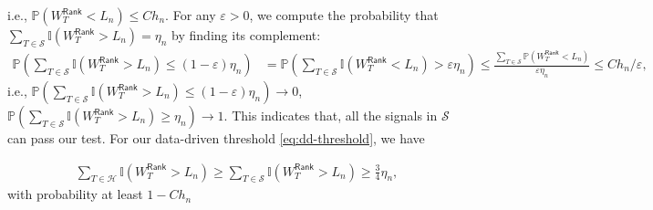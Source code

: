 \documentclass[12pt]{article}
\newcommand{\tF}{{\rm F}}
\newcommand{\abs}[1]{\left\lvert#1\right\rvert}
\newcommand{\norm}[1]{\left\lVert#1\right\rVert}
\newcommand{\PP}{\mathbb{P}}
\newcommand{\cH}{\mathcal{H}}
\newcommand{\cP}{\mathcal{P}}
\newcommand{\cS}{\mathcal{S}}
\newcommand{\bbI}{\mathbb{I}}
\def\PP{{\mathbb P}}
\theoremstyle{plain}
\begin{document}
i.e., $\PP(W_T^\mathsf{Rank}< L_n ) \le C h_n$.  For any $\varepsilon>0$, we compute the probability that $\sum\limits_{T\in\cS} \bbI(W_T^\mathsf{Rank}> L_n)=\eta_n$ by finding its complement:
 \begin{equation*}
\begin{aligned}
               \PP(\sum\limits_{T\in\cS} \bbI(W_T^\mathsf{Rank}> L_n)\le (1-\varepsilon)\eta_n )& =\PP(\sum\limits_{T\in\cS} \bbI(W_T^\mathsf{Rank}< L_n)> \varepsilon\eta_n )  \le \frac{\sum\limits_{T\in\cS} \PP(W_T^\mathsf{Rank}< L_n)}{\varepsilon\eta_n}\le C h_n/\varepsilon,
\end{aligned}
 \end{equation*}
 i.e., $ \PP(\sum\limits_{T\in\cS} \bbI(W_T^\mathsf{Rank}> L_n)\le (1-\varepsilon)\eta_n )\to 0$, $ \PP(\sum\limits_{T\in\cS} \bbI(W_T^\mathsf{Rank}> L_n)\ge \eta_n )\to 1$. This indicates that, all the signals in $\cS$ can pass our test. For our data-driven threshold \eqref{eq:dd-threshold}, we have 
 
  \begin{equation}\label{eq:dd-thre-lb}
\begin{aligned}
             \sum\limits_{T\in\cH} \bbI(W_T^\mathsf{Rank}> L_n)\ge   \sum\limits_{T\in\cS} \bbI(W_T^\mathsf{Rank}> L_n)\ge \frac{3}{4}\eta_n,
\end{aligned}
 \end{equation}
 with probability at least $1-C h_n$
\end{document}
